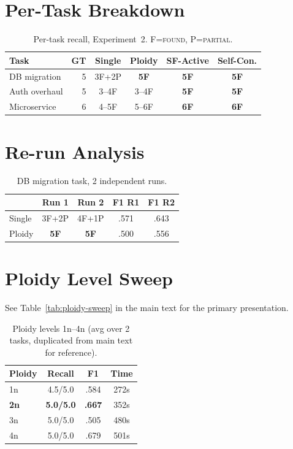 \documentclass{article}
\begin{document}
\section{Per-Task Breakdown}
\label{sec:pertask-appendix}

\begin{table}[H]
\centering
\caption{Per-task recall, Experiment~2. F=\textsc{found}, P=\textsc{partial}.}
\small
\begin{tabular}{@{}lr cccc@{}}
\toprule
\textbf{Task} & \textbf{GT} & \textbf{Single} & \textbf{Ploidy} & \textbf{SF-Active} & \textbf{Self-Con.} \\
\midrule
DB migration & 5 & 3F+2P & \textbf{5F} & \textbf{5F} & \textbf{5F} \\
Auth overhaul & 5 & 3--4F & 3--4F & \textbf{5F} & \textbf{5F} \\
Microservice & 6 & 4--5F & 5--6F & \textbf{6F} & \textbf{6F} \\
\bottomrule
\end{tabular}
\end{table}

\section{Re-run Analysis}
\begin{table}[H]
\centering
\caption{DB migration task, 2 independent runs.}
\small
\begin{tabular}{@{}lcccc@{}}
\toprule
& \textbf{Run 1} & \textbf{Run 2} & \textbf{F1 R1} & \textbf{F1 R2} \\
\midrule
Single & 3F+2P & 4F+1P & .571 & .643 \\
Ploidy & \textbf{5F} & \textbf{5F} & .500 & .556 \\
\bottomrule
\end{tabular}
\end{table}

\section{Ploidy Level Sweep}
See Table~\ref{tab:ploidy-sweep} in the main text for the primary presentation.
\begin{table}[H]
\centering
\caption{Ploidy levels 1n--4n (avg over 2 tasks, duplicated from main text for reference).}
\small
\begin{tabular}{@{}lccc@{}}
\toprule
\textbf{Ploidy} & \textbf{Recall} & \textbf{F1} & \textbf{Time} \\
\midrule
1n & 4.5/5.0 & .584 & 272s \\
\textbf{2n} & \textbf{5.0/5.0} & \textbf{.667} & 352s \\
3n & 5.0/5.0 & .505 & 480s \\
4n & 5.0/5.0 & .679 & 501s \\
\bottomrule
\end{tabular}
\end{table}
\end{document}
